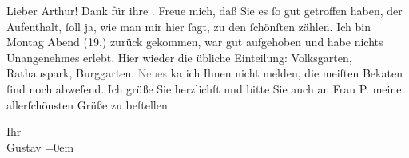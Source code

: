 \pstart{}Lieber Arthur!\pend\vspace{0.5em}
\pstart
           Dank für ihre \label{K_L04244-2v}\label{K_L04244-2}. Freue mich, daß Sie es{ }ſo gut getroffen haben, der Aufenthalt,{ }ſoll ja, wie man mir hier{ }ſagt, zu den{ }ſchönſten zählen. Ich bin Montag
               Abend (19.) zurück gekommen, war gut aufgehoben und habe nichts
               Unangenehmes erlebt. Hier wieder die übliche Einteilung: Volksgarten, Rathauspark, Burggarten. \textcolor{gray}{Neues} ka{\geminationn}
               ich Ihnen nicht melden, die meiſten Beka{\geminationn}ten{ }ſind noch
               abweſend. Ich grüße Sie {\pb}herzlichſt und
               bitte Sie auch an Frau P. meine allerſchönsten Grüße zu
               beſtellen\pend
           
\pstart
           Ihr{\\[\baselineskip]}\spacefill\mbox{Gustav}\pend
           \leftskip=0em{}\endnumbering{}
\begin{anhang}
\end{anhang}\newcommand{\dateiname}{L04244}\newcommand{\titel}{Gustav Schwarzkopf an Arthur Schnitzler, 27. 8. 1929}\newcommand{\editorInnen}{Herausgegeben von Jahnke, SelmaMüller, Martin Anton}
